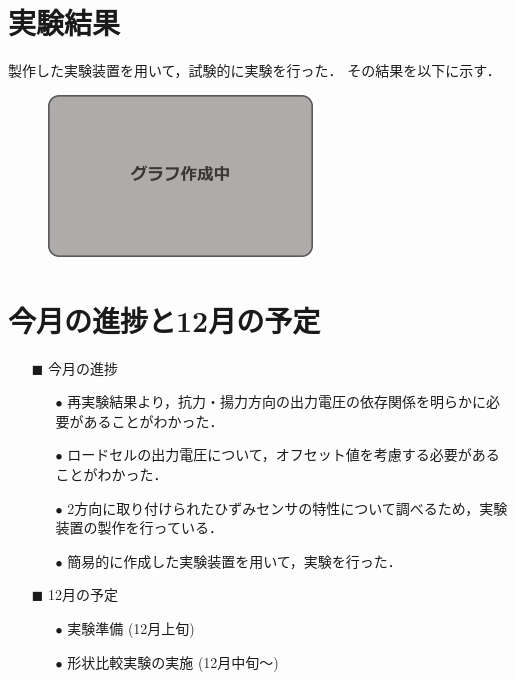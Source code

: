 \documentclass[twocolumn,a4j]{jsarticle}
\begin{document}
\newpage

\section{実験結果}
製作した実験装置を用いて，試験的に実験を行った．
その結果を以下に示す．

\begin{figure}[htbp]
    \footnotesize
    \begin{center}
        \includegraphics[width=70mm]{../images/making.png}
    \end{center}
\end{figure}


\newpage

\section{今月の進捗と12月の予定}
\begin{itemize}
    \item [$\blacksquare$] 今月の進捗
          \begin{itemize}
              \item [$\bullet$] 再実験結果より，抗力・揚力方向の出力電圧の依存関係を明らかに必要があることがわかった．
              \item [$\bullet$] ロードセルの出力電圧について，オフセット値を考慮する必要があることがわかった．
              \item [$\bullet$] 2方向に取り付けられたひずみセンサの特性について調べるため，実験装置の製作を行っている．
              \item [$\bullet$] 簡易的に作成した実験装置を用いて，実験を行った．
          \end{itemize}
    \item [$\blacksquare$] 12月の予定
          \begin{itemize}
              \item [$\bullet$] 実験準備 (12月上旬)
              \item [$\bullet$] 形状比較実験の実施 (12月中旬～)
          \end{itemize}
\end{itemize}
\end{document}
